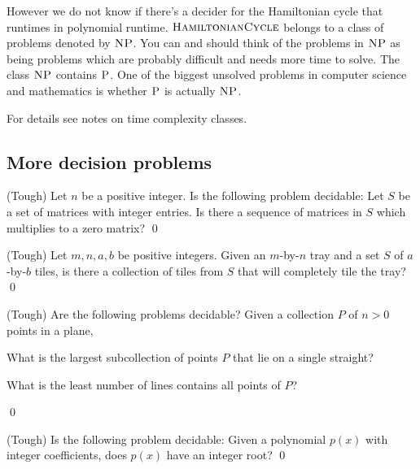 However we do not know if there's a decider for the
Hamiltonian cycle that
runtimes in polynomial runtime.
$\textsc{HamiltonianCycle}$ belongs to a class of problems
denoted by $\textsc{NP}$.
You can and should think of the problems in
$\textsc{NP}$ as being
problems which are probably difficult and needs
more time to solve.
The class $\textsc{NP}$ contains $\textsc{P}$.
One of the biggest unsolved problems in computer science
and mathematics
is whether $\textsc{P}$ is actually $\textsc{NP}$.

For details see notes on time complexity classes.


\newpage
\subsection{More decision problems}

\begin{ex} (Tough)
Let $n$ be a positive integer.
Is the following problem decidable:
Let $S$ be a set of matrices with integer entries.
Is there a sequence of matrices in $S$ which multiplies to a
zero matrix?
\qed
\end{ex}

\begin{ex} (Tough)
  Let $m,n,a,b$ be positive integers.
  Given an $m$-by-$n$ tray
  and a set $S$ of $a$-by-$b$ tiles, 
  is there a collection of tiles from $S$
  that will completely tile the tray?
  \qed
\end{ex}

\begin{ex} (Tough)
  Are the following problems decidable?
  Given a collection $P$ of $n > 0$ points in a plane,
  \begin{tightlist}
    \item What is the largest subcollection of points $P$ that lie
    on a single straight?
    \item What is the least number of lines contains all points of $P$?
  \end{tightlist}
  \qed
\end{ex}


\begin{ex} (Tough)
Is the following problem decidable:
Given a polynomial $p(x)$ with integer coefficients,
does $p(x)$ have an integer root?
\qed
\end{ex}
